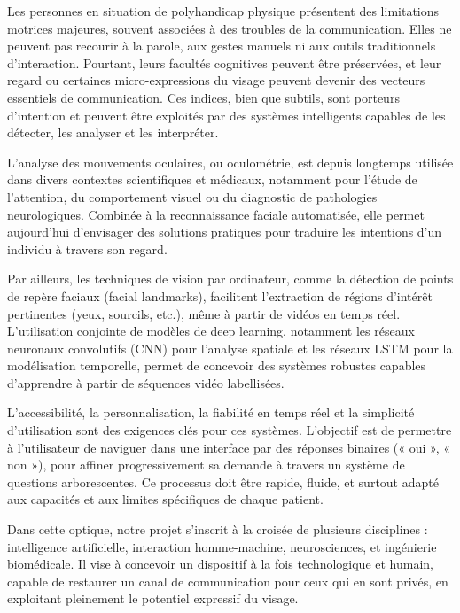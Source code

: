 \documentclass[
]{article}
\begin{document}
Les personnes en situation de polyhandicap physique présentent des limitations motrices majeures, souvent associées à des troubles de la communication. Elles ne peuvent pas recourir à la parole, aux gestes manuels ni aux outils traditionnels d'interaction. Pourtant, leurs facultés cognitives peuvent être préservées, et leur regard ou certaines micro-expressions du visage peuvent devenir des vecteurs essentiels de communication. Ces indices, bien que subtils, sont porteurs d'intention et peuvent être exploités par des systèmes intelligents capables de les détecter, les analyser et les interpréter.

L'analyse des mouvements oculaires, ou oculométrie, est depuis longtemps utilisée dans divers contextes scientifiques et médicaux, notamment pour l'étude de l'attention, du comportement visuel ou du diagnostic de pathologies neurologiques. Combinée à la reconnaissance faciale automatisée, elle permet aujourd'hui d'envisager des solutions pratiques pour traduire les intentions d'un individu à travers son regard.

Par ailleurs, les techniques de vision par ordinateur, comme la détection de points de repère faciaux (facial landmarks), facilitent l'extraction de régions d'intérêt pertinentes (yeux, sourcils, etc.), même à partir de vidéos en temps réel. L'utilisation conjointe de modèles de deep learning, notamment les réseaux neuronaux convolutifs (CNN) pour l'analyse spatiale et les réseaux LSTM pour la modélisation temporelle, permet de concevoir des systèmes robustes capables d'apprendre à partir de séquences vidéo labellisées.

L'accessibilité, la personnalisation, la fiabilité en temps réel et la simplicité d'utilisation sont des exigences clés pour ces systèmes. L'objectif est de permettre à l'utilisateur de naviguer dans une interface par des réponses binaires (« oui », « non »), pour affiner progressivement sa demande à travers un système de questions arborescentes. Ce processus doit être rapide, fluide, et surtout adapté aux capacités et aux limites spécifiques de chaque patient.

Dans cette optique, notre projet s'inscrit à la croisée de plusieurs disciplines : intelligence artificielle, interaction homme-machine, neurosciences, et ingénierie biomédicale. Il vise à concevoir un dispositif à la fois technologique et humain, capable de restaurer un canal de communication pour ceux qui en sont privés, en exploitant pleinement le potentiel expressif du visage.
\end{document}
